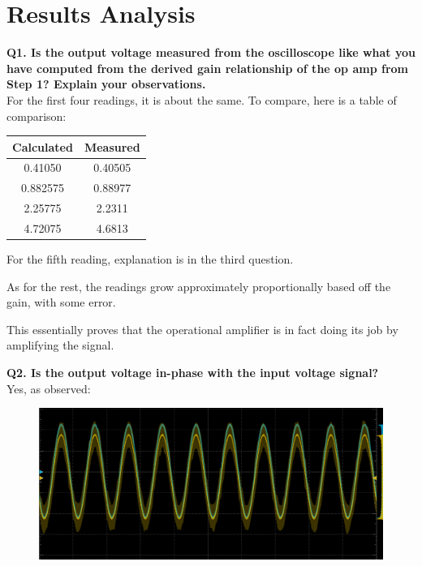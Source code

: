\documentclass[a4paper,12pt,oneside, tikz]{book}
\begin{document}
\section{Results Analysis}
\begin{tcolorbox}
\textbf{Q1. Is the output voltage measured from the oscilloscope like what you have computed from the derived gain relationship of the op amp from Step 1? Explain your observations.} \\

For the first four readings, it is about the same. To compare, here is a table of comparison:

\begin{center}
    \begin{tabular}{|c|c|}
 \hline Calculated & Measured \\
 \hline 0.41050 & 0.40505 \\
        0.882575 & 0.88977 \\
        2.25775 & 2.2311 \\
        4.72075 & 4.6813 \\
 \hline
    \end{tabular}
\end{center}

For the fifth reading, explanation is in the third question.

As for the rest, the readings grow approximately proportionally based off the gain, with some error.

This essentially proves that the operational amplifier is in fact doing its job by amplifying the signal.
\end{tcolorbox}
\begin{tcolorbox}
\textbf{Q2. Is the output voltage in-phase with the input voltage signal?} \\
Yes, as observed:
\begin{figure}[H]
    \centering
    \includegraphics[width=120mm]{./images/in_phase.png}
\end{figure}
\end{tcolorbox}
\end{document}
